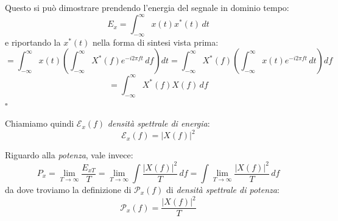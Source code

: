 \documentclass[a4paper,11pt]{article}
\begin{document}
Questo si può dimostrare prendendo l'energia del segnale in dominio tempo:
$$
E_x = \int_{-\infty}^{\infty} x(t) x^*(t) \, dt
$$
e riportando la $x^*(t)$ nella forma di sintesi vista prima:
$$
= \int_{-\infty}^{\infty} x(t) \left( \int_{-\infty}^{\infty} X^*(f) e^{-i 2 \pi f t} \, df  \right) dt
= \int_{-\infty}^{\infty} X^*(f) \left( \int_{-\infty}^{\infty} x(t) e^{-i 2 \pi f t} \, dt \right) df  
$$
$$
= \int_{-\infty}^{\infty} X^*(f) X(f) \, df
$$
\hfill $\square$

Chiamiamo quindi $\mathcal{E}_x(f)$ \textit{densità spettrale di energia}:
$$
\mathcal{E}_x(f) = |X(f)|^2
$$

\par\smallskip

Riguardo alla \textit{potenza}, vale invece:
$$
P_x = \lim_{T \rightarrow \infty} \frac{E_{xT}}{T} = \lim_{T \rightarrow \infty} \int \frac{|X(f)|^2}{T} \, df = \int \lim_{T \rightarrow \infty} \frac{|X(f)|^2}{T} \, df
$$
da dove troviamo la definizione di $\mathcal{P}_x(f)$ di \textit{densità spettrale di potenza}:
$$
\mathcal{P}_x(f) = \frac{|X(f)|^2}{T}  
$$
\end{document}
